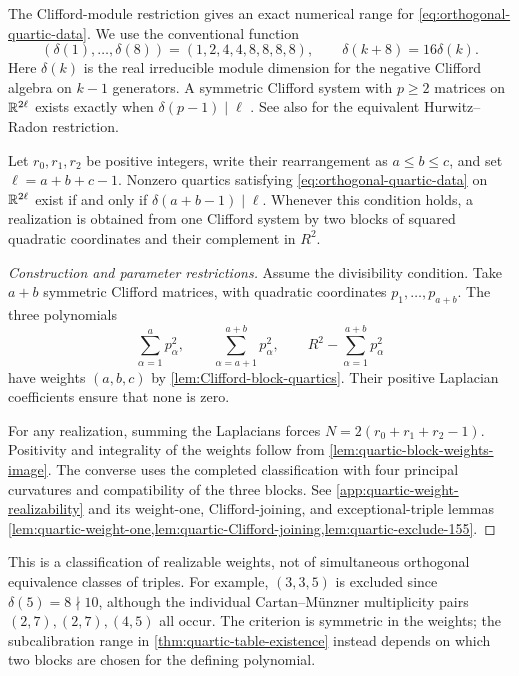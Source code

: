 The Clifford-module restriction gives an exact numerical range for
\eqref{eq:orthogonal-quartic-data}. We use the conventional function
\[
 (\delta(1),\ldots,\delta(8))=(1,2,4,4,8,8,8,8),
 \qquad \delta(k+8)=16\delta(k).
\]
Here $\delta(k)$ is the real irreducible module dimension for the
negative Clifford algebra on $k-1$ generators. A symmetric Clifford
system with $p\ge2$ matrices on $\mathbb R^{2\ell}$ exists exactly when
$\delta(p-1)\mid\ell$ \cite[Section~3.5]{FKM81}.
See also \cite[Chapter~0, pp.~3--4]{Shapiro2000} for the equivalent
Hurwitz--Radon restriction.

\begin{proposition}
\label{prop:quartic-weight-realizability}
Let $r_0,r_1,r_2$ be positive integers, write their rearrangement as
$a\le b\le c$, and set $\ell=a+b+c-1$.
Nonzero quartics satisfying \eqref{eq:orthogonal-quartic-data} on
$\mathbb R^{2\ell}$ exist if and only if \(\delta(a+b-1)\mid\ell\).
Whenever this condition holds, a realization is obtained from one
Clifford system by two blocks of squared quadratic coordinates and
their complement in $R^2$.
\end{proposition}

\begin{proof}[Construction and parameter restrictions]
\leavevmode\par\nobreak
Assume the divisibility condition. Take $a+b$ symmetric Clifford
matrices, with quadratic coordinates $p_1,\ldots,p_{a+b}$.
The three polynomials
\[
 \sum_{\alpha=1}^{a}p_\alpha^2,\qquad
 \sum_{\alpha=a+1}^{a+b}p_\alpha^2,\qquad
 R^2-\sum_{\alpha=1}^{a+b}p_\alpha^2
\]
have weights $(a,b,c)$ by \cref{lem:Clifford-block-quartics}.
Their positive Laplacian coefficients ensure that none is zero.

For any realization, summing the Laplacians forces
$N=2(r_0+r_1+r_2-1)$. Positivity and integrality of the weights follow from
\cref{lem:quartic-block-weights-image}.
The converse uses the completed classification with four principal
curvatures and compatibility of the three blocks. See
\cref{app:quartic-weight-realizability} and its weight-one,
Clifford-joining, and exceptional-triple lemmas
\cref{lem:quartic-weight-one,lem:quartic-Clifford-joining,lem:quartic-exclude-155}.
\end{proof}

This is a classification of realizable weights, not of simultaneous
orthogonal equivalence classes of triples. For example, $(3,3,5)$
is excluded since $\delta(5)=8\nmid10$, although the individual
Cartan--M\"unzner multiplicity pairs $(2,7),(2,7),(4,5)$ all occur.
The criterion is symmetric in the weights; the subcalibration
range in \cref{thm:quartic-table-existence} instead depends on
which two blocks are chosen for the defining polynomial.

